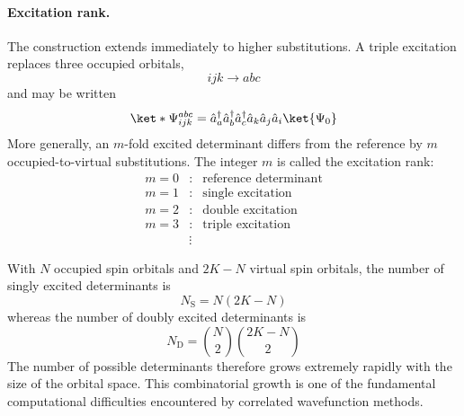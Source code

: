 \documentclass[11pt,a4paper,titlepage]{article}
\numberwithin{equation}{section}
\newcommand{\cre}[1]{\Hat{a}_{#1}^\dag}
\newcommand{\ani}[1]{\Hat{a}_{#1}}
\begin{document}

\paragraph{Excitation rank.}

The construction extends immediately to higher substitutions. A triple
excitation replaces three occupied orbitals,
\begin{equation}
  ijk\longrightarrow abc
\end{equation}
and may be written
\begin{equation}
  \ket*{\Psi_{ijk}^{abc}}
  =
  \cre{a}\cre{b}\cre{c}
  \ani{k}\ani{j}\ani{i}
  \ket{\Psi_0}
\end{equation}
More generally, an $m$-fold excited determinant differs from the reference
by $m$ occupied-to-virtual substitutions. The integer $m$ is called the
excitation rank:
\begin{equation}
  \begin{array}{ccl}
    m=0 &:& \text{reference determinant}\\
    m=1 &:& \text{single excitation}\\
    m=2 &:& \text{double excitation}\\
    m=3 &:& \text{triple excitation}\\
    &\vdots&
  \end{array}
\end{equation}

With $N$ occupied spin orbitals and $2K-N$ virtual spin orbitals, the number
of singly excited determinants is
\begin{equation}
  N_\text{S}
  =
  N(2K-N)
\end{equation}
whereas the number of doubly excited determinants is
\begin{equation}
  N_\text{D}
  =
  \binom{N}{2}
  \binom{2K-N}{2}
\end{equation}
The number of possible determinants therefore grows extremely rapidly with
the size of the orbital space. This combinatorial growth is one of the
fundamental computational difficulties encountered by correlated
wavefunction methods.

\end{document}
